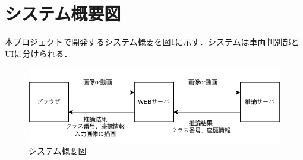 \section{システム概要図}
本プロジェクトで開発するシステム概要を図\ref{FIG}に示す．システムは車両判別部とUIに分けられる．\\

\begin{figure}
	\centering
	\includegraphics [width=\linewidth]{fig/system.pdf}
	\caption{システム概要図}
	\label{FIG}
\end{figure}






